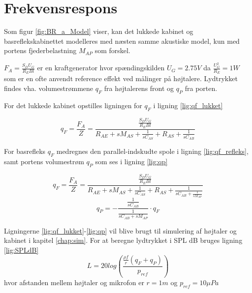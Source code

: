 \chapter{Frekvensrespons}

Som figur \ref{fig:BR_a_Model} viser, kan det lukkede kabinet og basreflekskabinettet modelleres med næsten samme akustiske model, kun med portens fjederbelastning $M_{AP}$ som forskel. 

$F_A=\frac{S_D U_G}{R_E Bl}$ er en kraftgenerator hvor spændingskilden $U_G = 2.75V$ da $\frac{U_G ^2}{R_E}=1W $ som er en ofte anvendt reference effekt ved målinger på højtalere.
Lydtrykket findes vha. volumestrømmene $q_F$ fra højtalerens front og $q_P$ fra porten.

For det lukkede kabinet opstilles ligningen for $q_F$ i ligning \ref{lig:qf_lukket}

\begin{equation}\label{lig:qf_lukket}
q_F = \frac{F_A}{Z} = \frac{ \frac{S_D U_G}{R_E Bl} }{ R_{AE} + sM_{AS} + \frac{1}{ sC_{AS} } + R_{AS} + \frac{1}{sC_{AB} }}
\end{equation}

For basrefleks $ q_F $ medregnes den parallel-indskudte spole i ligning \ref{lig:qf_refleks}, samt portens volumestrøm $ q_P $ som ses i ligning \ref{lig:qp}

\begin{equation}\label{lig:qf_refleks}
q_F=\frac{F_A}{Z}=\frac{\frac{S_D U_G}{R_E Bl}}{ R_{AE}+sM_{AS}+ \frac{1}{sC_{AS} } + R_{AS} + \frac{1}{sC_{AB} + \frac{1}{sM_{AP}}}  }
\end{equation}
\begin{equation}\label{lig:qp}
q_P=-\frac{ \frac{1}{sC_{AB}} }{ \frac{1}{sC_{AB} +sM_{AP}  }}\cdot q_F
\end{equation}

Ligningerne \ref{lig:qf_lukket}-\ref{lig:qp} vil blive brugt til simulering af højtaler og kabinet i kapitel \ref{chap:sim}. For at beregne lydtrykket i SPL dB bruges ligning \ref{lig:SPLdB}
\begin{equation}\label{lig:SPLdB}
L=20 log( \frac{ \frac{\rho f}{r} (q_F+q_P) }{p_{ref}} )
\end{equation}
hvor afstanden mellem højtaler og mikrofon er $r=1m$ og $p_{ref}=10 \mu Pa $